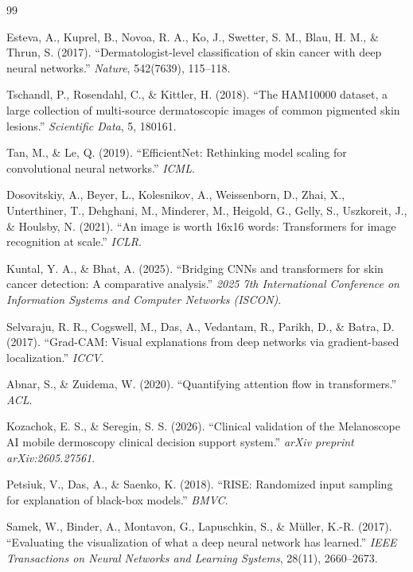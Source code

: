 \documentclass[10pt,twocolumn,letterpaper]{article}
\begin{document}
\begin{thebibliography}{99}

Esteva, A., Kuprel, B., Novoa, R. A., Ko, J., Swetter, S. M., Blau, H. M., \& Thrun, S. (2017).
``Dermatologist-level classification of skin cancer with deep neural networks.''
\textit{Nature}, 542(7639), 115--118.

Tschandl, P., Rosendahl, C., \& Kittler, H. (2018).
``The HAM10000 dataset, a large collection of multi-source dermatoscopic images of common pigmented skin lesions.''
\textit{Scientific Data}, 5, 180161.

Tan, M., \& Le, Q. (2019).
``EfficientNet: Rethinking model scaling for convolutional neural networks.''
\textit{ICML}.

Dosovitskiy, A., Beyer, L., Kolesnikov, A., Weissenborn, D., Zhai, X., Unterthiner, T., Dehghani, M., Minderer, M., Heigold, G., Gelly, S., Uszkoreit, J., \& Houlsby, N. (2021).
``An image is worth 16x16 words: Transformers for image recognition at scale.''
\textit{ICLR}.

Kuntal, Y. A., \& Bhat, A. (2025).
``Bridging CNNs and transformers for skin cancer detection: A comparative analysis.''
\textit{2025 7th International Conference on Information Systems and Computer Networks (ISCON)}.

Selvaraju, R. R., Cogswell, M., Das, A., Vedantam, R., Parikh, D., \& Batra, D. (2017).
``Grad-CAM: Visual explanations from deep networks via gradient-based localization.''
\textit{ICCV}.

Abnar, S., \& Zuidema, W. (2020).
``Quantifying attention flow in transformers.''
\textit{ACL}.

Kozachok, E. S., \& Seregin, S. S. (2026).
``Clinical validation of the Melanoscope AI mobile dermoscopy clinical decision support system.''
\textit{arXiv preprint arXiv:2605.27561}.

Petsiuk, V., Das, A., \& Saenko, K. (2018).
``RISE: Randomized input sampling for explanation of black-box models.''
\textit{BMVC}.

Samek, W., Binder, A., Montavon, G., Lapuschkin, S., \& M\"uller, K.-R. (2017).
``Evaluating the visualization of what a deep neural network has learned.''
\textit{IEEE Transactions on Neural Networks and Learning Systems}, 28(11), 2660--2673.


\end{thebibliography}
\end{document}
